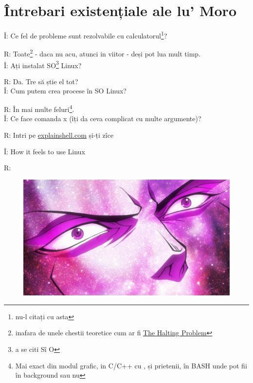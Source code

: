 \documentclass[11pt,a4paper]{article}
\begin{document}
\section{Întrebari existențiale ale lu' Moro}

Î: Ce fel de probleme sunt rezolvabile cu calculatorul\footnote{nu-l citați cu asta}?

R: Toate\footnote{inafara de unele chestii teoretice cum ar fi
  \href{https://en.wikipedia.org/wiki/Halting_problem}{The Halting Problem}} - daca nu acu, atunci in viitor - deși pot lua mult timp.
\\

Î: Ați instalat SO\footnote{a se citi Sî O} Linux?

R: Da. Tre să știe el tot?
\\

Î: Cum putem crea procese în SO Linux?

R: În mai multe feluri\footnote{Mai exact din modul grafic, in C/C++ cu ,  și prietenii, în BASH unde pot fii în background sau nu}.
\\

Î: Ce face comanda x (îți da ceva complicat cu multe argumente)?

R: Intri pe \href{https://explainshell.com}{explainshell.com} și-ți zîce
\newpage

Î: How it feels to use Linux

R: 


\begin{figure}[!hbt]
  \captionsetup{labelformat=empty}
\includegraphics[width=\linewidth]{kars.jpg}
\end{figure}
\end{document}
